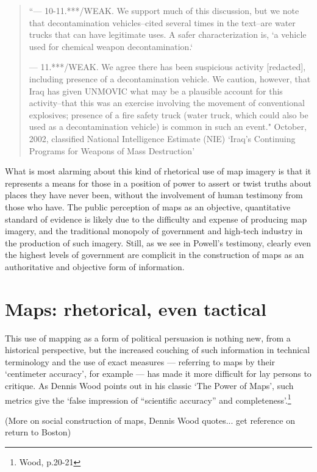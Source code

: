\documentclass[11pt,oneside,notitlepage]{report}
\begin{document}
\begin{quote}
	``--- 10-11.***/WEAK. We support much of this discussion, but we note that decontamination vehicles--cited several times in the text--are water trucks that can have legitimate uses. A safer characterization is, `a vehicle used for chemical weapon decontamination.`

--- 11.***/WEAK. We agree there has been suspicious activity [redacted], including presence of a decontamination vehicle. We caution, however, that Iraq has given UNMOVIC what may be a plausible account for this activity--that this was an exercise involving the movement of conventional explosives; presence of a fire safety truck (water truck, which could also be used as a decontamination vehicle) is common in such an event."
	October, 2002, classified National Intelligence Estimate (NIE) `Iraq's Continuing Programs for Weapons of Mass Destruction' \cite{senate2004report}
\end{quote} 

What is most alarming about this kind of rhetorical use of map imagery is that it represents a means for those in a position of power to assert or twist truths about places they have never been, without the involvement of human testimony from those who have. The public perception of maps as an objective, quantitative standard of evidence is likely due to the difficulty and expense of producing map imagery, and the traditional monopoly of government and high-tech industry in the production of such imagery. Still, as we see in Powell's testimony, clearly even the highest levels of government are complicit in the construction of maps as an authoritative and objective form of information.

\section{Maps: rhetorical, even tactical}

This use of mapping as a form of political persuasion is nothing new, from a historical perspective, but the increased couching of such information in technical terminology and the use of exact measures --- referring to maps by their `centimeter accuracy', for example --- has made it more difficult for lay persons to critique. As Dennis Wood points out in his classic `The Power of Maps', such metrics give the `false impression of ``scientific accuracy'' and completeness'.\footnote{Wood, p.20-21}

(More on social construction of maps, Dennis Wood quotes... get reference on return to Boston)
\end{document}
